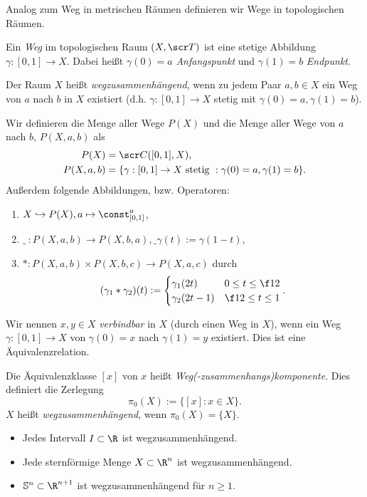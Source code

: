 Analog zum Weg in metrischen Räumen definieren wir Wege in topologischen Räumen.

\begin{df}
	Ein \emph{Weg} im topologischen Raum $(X, \scr T)$ ist eine stetige Abbildung $\gamma: [0,1] \to X$.
	Dabei heißt $\gamma(0) = a$ \emph{Anfangspunkt} und $\gamma(1) = b$ \emph{Endpunkt}.

	Der Raum $X$ heißt \emph{wegzusammenhängend}, wenn zu jedem Paar $a,b \in X$ ein Weg von $a$ nach $b$ in $X$ existiert (d.h. $\gamma:[0,1] \to X$ stetig mit $\gamma(0) = a, \gamma(1) = b$).

	Wir definieren die Menge aller Wege $P(X)$ und die Menge aller Wege von $a$ nach $b$, $P(X, a, b)$ als
	\begin{align*}
		P(X) &= \scr C ([0,1], X), \\
		P(X, a, b) &= \{ \gamma : [0,1] \to X \text{ stetig } : \gamma(0) = a, \gamma(1) = b \}.
	\end{align*}
	Außerdem folgende Abbildungen, bzw. Operatoren:
	\begin{enumerate}[1)]
		\item
			$X \injto P(X), a \mapsto \const_{[0,1]}^a$,
		\item
			$\_\  : P(X, a, b) \to P(X, b, a), \_\gamma(t) := \gamma(1-t)$,
		\item
			$\ast: P(X, a, b) \times P(X, b, c) \to P(X, a, c)$ durch
			\[
				(\gamma_1 \ast \gamma_2)(t) := \begin{cases}
					\gamma_1 (2t) & 0 \le t \le \f 12 \\
					\gamma_2 (2t - 1) & \f 12 \le t \le 1
				\end{cases}.
			\]
	\end{enumerate}
\end{df}

\begin{df}
	Wir nennen $x,y \in X$ \emph{verbindbar} in $X$ (durch einen Weg in $X$), wenn ein Weg $\gamma: [0,1] \to X$ von $\gamma(0) = x$ nach $\gamma(1) = y$ existiert.
	Dies ist eine Äquivalenzrelation.

	Die Äquivalenzklasse $[x]$ von $x$ heißt \emph{Weg(-zusammenhangs)komponente}.
	Dies definiert die Zerlegung
	\[
		\pi_0 (X) := \{ [x] : x \in X \}.
	\]
	$X$ heißt \emph{wegzusammenhängend}, wenn $\pi_0(X) = \{X\}$.
\end{df}

\begin{ex}
	\begin{itemize}
		\item
			Jedes Intervall $I \subset \R$ ist wegzusammenhängend.
		\item
			Jede sternförmige Menge $X \subset \R^n$ ist wegzusammenhängend.
		\item
			$\S^n \subset \R^{n+1}$ ist wegzusammenhängend für $n \ge 1$.
	\end{itemize}
\end{ex}


